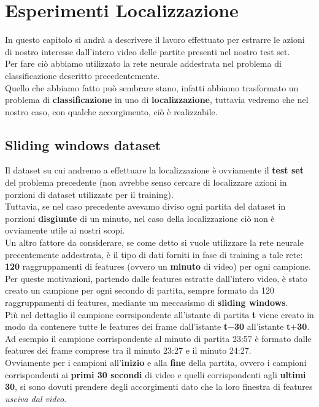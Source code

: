 \chapter{Esperimenti Localizzazione}\label{ch:chapter3}
In questo capitolo si andrà a descrivere il lavoro effettuato per estrarre le azioni di nostro interesse dall'intero video delle partite presenti nel nostro test set.
\\Per fare ciò abbiamo utilizzato la rete neurale addestrata nel problema di classificazione descritto precedentemente.
\\Quello che abbiamo fatto  può sembrare stano, infatti abbiamo trasformato un problema di \textbf{classificazione} in uno di \textbf{localizzazione}, tuttavia vedremo che nel nostro caso, con qualche accorgimento, ciò è realizzabile.
\section{Sliding windows dataset}
Il dataset su cui andremo a effettuare la localizzazione è ovviamente il \textbf{test set} del problema precedente (non avrebbe senso cercare di localizzare azioni in porzioni di dataset utilizzate per il training).
\\Tuttavia, se nel caso precedente avevamo diviso ogni partita del dataset in porzioni \textbf{disgiunte} di un minuto, nel caso della localizzazione ciò non è ovviamente utile ai nostri scopi.
\\Un altro fattore da considerare, se come detto si vuole utilizzare la rete neurale precentemente addestrata, è  il tipo di dati forniti in fase di training a tale rete: \textbf{120} raggruppamenti di features (ovvero un \textbf{minuto} di video) per ogni campione.
\\Per queste motivazioni, partendo dalle features estratte dall'intero video, è stato creato un campione per ogni secondo di partita, sempre formato da 120 raggruppamenti di features, mediante un meccasismo di \textbf{sliding windows}.
\\Più nel dettaglio il campione corrsipondente all'istante di partita \textbf{t} viene creato in modo da contenere tutte le features dei frame dall'istante \textbf{t$-$30} all'istante \textbf{t$+$30}.
\\Ad esempio il campione corrispondente al minuto di partita 23:57 è formato dalle features dei frame comprese tra il minuto 23:27 e il minuto  24:27.
\\Ovviamente per i campioni all'\textbf{inizio} e alla \textbf{fine} della partita, ovvero i campioni corrispondenti ai \textbf{primi 30 secondi} di video e quelli corrispondenti agli \textbf{ultimi 30}, si sono dovuti prendere degli accorgimenti dato che la loro finestra di features \textit{usciva dal video}.

